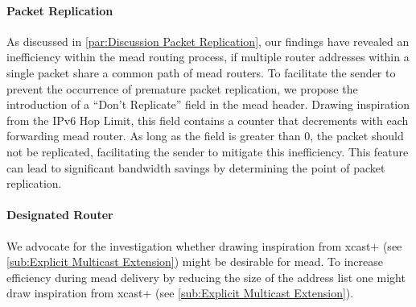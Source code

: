 \paragraph{Packet Replication} %
\label{par:Proposal Packet Replication}
As discussed in \autoref{par:Discussion Packet Replication}, our findings have
    revealed an inefficiency within the \gls{mead} routing process, if multiple
    router addresses within a single packet share a common path of \gls{mead}
    routers.
To facilitate the sender to prevent the occurrence of premature packet
    replication, we propose the introduction of a ``Don't Replicate'' field in
    the \gls{mead} header.
Drawing inspiration from the IPv6 Hop Limit, this field contains a counter that
    decrements with each forwarding \gls{mead} router.
As long as the field is greater than 0, the packet should not be replicated,
    facilitating the sender to mitigate this inefficiency.
This feature can lead to significant bandwidth savings by determining the point
    of packet replication.

\paragraph{Designated Router} %
\label{par:Designated Router}
We advocate for the investigation whether drawing inspiration from \gls{xcast+}
    \cite{xcast+} (see \autoref{sub:Explicit Multicast Extension}) might be
    desirable for \gls{mead}.
To increase efficiency during \gls{mead} delivery by reducing the size of the
    address list one might draw inspiration from \gls{xcast+} \cite{xcast+}
    (see \autoref{sub:Explicit Multicast Extension}).




